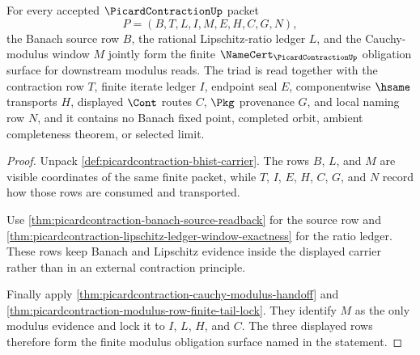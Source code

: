 \begin{theorem}
\label{thm:picardcontraction-finite-modulus-obligation-triad}
For every accepted $\PicardContractionUp$ packet
$$
P=(B,T,L,I,M,E,H,C,G,N),
$$
the Banach source row $B$, the rational Lipschitz-ratio ledger $L$, and the
Cauchy-modulus window $M$ jointly form the finite $\NameCert_{\PicardContractionUp}$
obligation surface for downstream modulus reads. The triad is read together
with the contraction row $T$, finite iterate ledger $I$, endpoint seal $E$,
componentwise $\hsame$ transports $H$, displayed $\Cont$ routes $C$, $\Pkg$
provenance $G$, and local naming row $N$, and it contains no Banach fixed
point, completed orbit, ambient completeness theorem, or selected limit.
\end{theorem}
\begin{proof}
Unpack \autoref{def:picardcontraction-bhist-carrier}. The rows $B$, $L$, and
$M$ are visible coordinates of the same finite packet, while $T$, $I$, $E$,
$H$, $C$, $G$, and $N$ record how those rows are consumed and transported.

Use \autoref{thm:picardcontraction-banach-source-readback} for the source row
and \autoref{thm:picardcontraction-lipschitz-ledger-window-exactness} for the
ratio ledger. These rows keep Banach and Lipschitz evidence inside the
displayed carrier rather than in an external contraction principle.

Finally apply \autoref{thm:picardcontraction-cauchy-modulus-handoff} and
\autoref{thm:picardcontraction-modulus-row-finite-tail-lock}. They identify
$M$ as the only modulus evidence and lock it to $I$, $L$, $H$, and $C$. The
three displayed rows therefore form the finite modulus obligation surface
named in the statement.
\end{proof}

